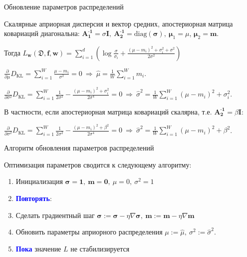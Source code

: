 \documentclass{beamer}
\newcommand{\DD}{{\mathfrak{D}}}
\newcommand{\bw}{{\textbf{w}}}
\newcommand{\II}{{\textbf{I}}}
\newcommand{\bbf}{{\textbf{f}}}
\newcommand{\bm}{{\textbf{m}}}
\newcommand{\bs}{{\boldsymbol{\sigma}}}
\newcommand{\bAo}{\mathbf{A^\text{-1}_\text{1}}}
\newcommand{\bAt}{\mathbf{A^\text{-1}_\text{2}}}
\newcommand{\bmuo}{{\boldsymbol{\mu}_1}}
\newcommand{\bmut}{{\boldsymbol{\mu}_2}}
\newcommand{\DKL}{\mathit{D}_{\text{KL}}}
\begin{document}
\begin{frame}{Обновление параметров распределений}

Скалярные априорная дисперсия и вектор средних, апостериорная матрица ковариаций диагональна: $\bAo = \sigma\II, \ \bAt = \text{diag}(\bs), \ \bmuo = \mu$, $\bmut = \bm$.

Тогда $L_\bw(\DD,\bbf,\bw) = \sum\limits_{i=1}^d(\log\frac{\sigma}{\sigma_i} + \frac{(\mu-m_i)^2 + \sigma_i^2 + \sigma^2}{2\sigma^2})$

$\frac\partial{\partial\mu}\DKL = \sum\limits_{i=1}^W\frac{\mu-m_i}{\sigma^2}=0 \ \Rightarrow \ \hat{\mu} = \frac1W\sum\limits_{i=1}^W m_i$.

$\frac\partial{\partial\sigma^2}\DKL = \sum\limits_{i=1}^W \frac1{2\sigma^2}-\frac{(\mu-m_i)^2 + \sigma_i^2}{2\sigma^4}=0 \ \Rightarrow \ \hat{\sigma}^2 = \frac1W\sum\limits_{i=1}^W (\mu-m_i)^2 + \sigma_i^2$.

В частности, если апостериорная матрица ковариаций скалярна, т.е. $\bAt = \beta \II$:


$\frac\partial{\partial\sigma^2}\DKL = \sum\limits_{i=1}^W \frac1{2\sigma^2}-\frac{(\mu-m_i)^2 + \beta^2}{2\sigma^4}=0 \ \Rightarrow \ \hat{\sigma}^2 = \frac1W\sum\limits_{i=1}^W (\mu-m_i)^2 + \beta^2$.

\end{frame}

\begin{frame}{Алгоритм обновления параметров распределений}

Оптимизация параметров сводится к следующему алгоритму:

\begin{enumerate}
	\item Инициализация $\bs = \textbf{1}, \ \bm = \textbf{0}, \ \mu = 0, \ \sigma^2 = 1$
	
	\item \textcolor{blue}{\textbf{Повторять}}:
	
	\item Сделать градиентный шаг $\bs:=\bs-\eta\nabla\bs, \ \bm:=\bm-\eta\nabla\bm$
	
	\item Обновить параметры априорного распределения $\mu:= \hat{\mu}, \ \sigma^2:=\hat{\sigma}^2$.
	
	\item \textcolor{blue}{\textbf{Пока}} значение $L$ не стабилизируется
	

\end{enumerate}

\end{frame}
\end{document}
